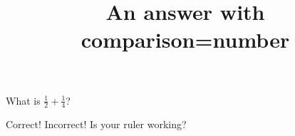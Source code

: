 \documentclass[hidesidemenu]{webquiz}
\title{An answer with comparison=number}
\begin{document}
  \begin{question}     %
      What is $\frac12+\frac14$?

     \whenRight Correct!
     \whenWrong Incorrect! Is your ruler working?
  \end{question}
\end{document}
